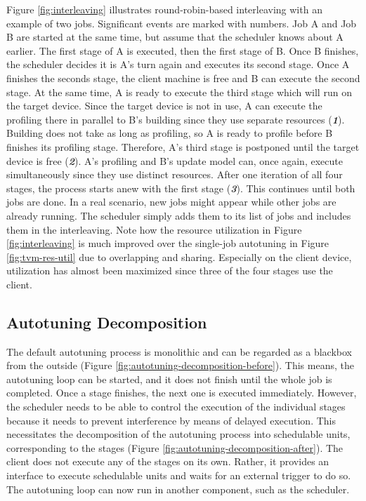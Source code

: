Figure \ref{fig:interleaving} illustrates round-robin-based interleaving with an example of two jobs. Significant events are marked with numbers. Job A and Job B are started at the same time, but assume that the scheduler knows about A earlier. The first stage of A is executed, then the first stage of B. Once B finishes, the scheduler decides it is A's turn again and executes its second stage. Once A finishes the seconds stage, the client machine is free and B can execute the second stage. At the same time, A is ready to execute the third stage which will run on the target device. Since the target device is not in use, A can execute the profiling there in parallel to B's building since they use separate resources (\textbf{\textit{1}}). Building does not take as long as profiling, so A is ready to profile before B finishes its profiling stage. Therefore, A's third stage is postponed until the target device is free (\textbf{\textit{2}}). A's profiling and B's update model can, once again, execute simultaneously since they use distinct resources. After one iteration of all four stages, the process starts anew with the first stage (\textbf{\textit{3}}). This continues until both jobs are done. In a real scenario, new jobs might appear while other jobs are already running. The scheduler simply adds them to its list of jobs and includes them in the interleaving. Note how the resource utilization in Figure \ref{fig:interleaving} is much improved over the single-job autotuning in Figure \ref{fig:tvm-res-util} due to overlapping and sharing. Especially on the client device, utilization has almost been maximized since three of the four stages use the client.

\subsection{Autotuning Decomposition}
The default autotuning process is monolithic and can be regarded as a blackbox from the outside (Figure \ref{fig:autotuning-decomposition-before}). This means, the autotuning loop can be started, and it does not finish until the whole job is completed. Once a stage finishes, the next one is executed immediately. However, the scheduler needs to be able to control the execution of the individual stages because it needs to prevent interference by means of delayed execution. This necessitates the decomposition of the autotuning process into schedulable units, corresponding to the stages  (Figure \ref{fig:autotuning-decomposition-after}). The client does not execute any of the stages on its own. Rather, it provides an interface to execute schedulable units and waits for an external trigger to do so. The autotuning loop can now run in another component, such as the scheduler.

